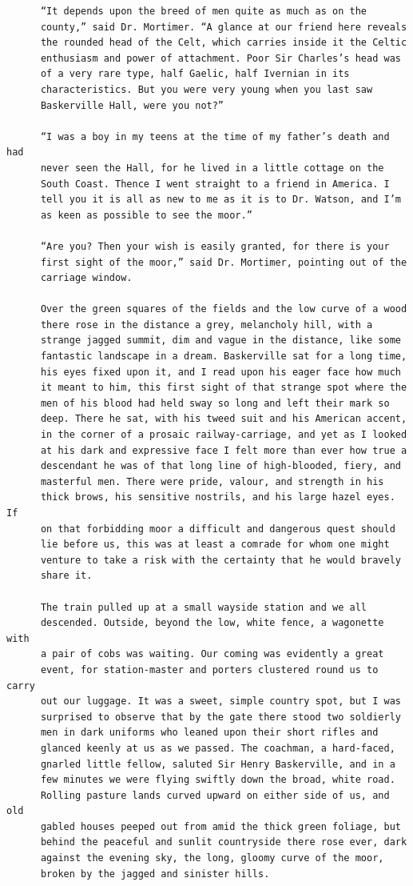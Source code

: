 \documentclass{article}
\begin{document}
\begin{verbatim}
      “It depends upon the breed of men quite as much as on the
      county,” said Dr. Mortimer. “A glance at our friend here reveals
      the rounded head of the Celt, which carries inside it the Celtic
      enthusiasm and power of attachment. Poor Sir Charles’s head was
      of a very rare type, half Gaelic, half Ivernian in its
      characteristics. But you were very young when you last saw
      Baskerville Hall, were you not?”

      “I was a boy in my teens at the time of my father’s death and had
      never seen the Hall, for he lived in a little cottage on the
      South Coast. Thence I went straight to a friend in America. I
      tell you it is all as new to me as it is to Dr. Watson, and I’m
      as keen as possible to see the moor.”

      “Are you? Then your wish is easily granted, for there is your
      first sight of the moor,” said Dr. Mortimer, pointing out of the
      carriage window.

      Over the green squares of the fields and the low curve of a wood
      there rose in the distance a grey, melancholy hill, with a
      strange jagged summit, dim and vague in the distance, like some
      fantastic landscape in a dream. Baskerville sat for a long time,
      his eyes fixed upon it, and I read upon his eager face how much
      it meant to him, this first sight of that strange spot where the
      men of his blood had held sway so long and left their mark so
      deep. There he sat, with his tweed suit and his American accent,
      in the corner of a prosaic railway-carriage, and yet as I looked
      at his dark and expressive face I felt more than ever how true a
      descendant he was of that long line of high-blooded, fiery, and
      masterful men. There were pride, valour, and strength in his
      thick brows, his sensitive nostrils, and his large hazel eyes. If
      on that forbidding moor a difficult and dangerous quest should
      lie before us, this was at least a comrade for whom one might
      venture to take a risk with the certainty that he would bravely
      share it.

      The train pulled up at a small wayside station and we all
      descended. Outside, beyond the low, white fence, a wagonette with
      a pair of cobs was waiting. Our coming was evidently a great
      event, for station-master and porters clustered round us to carry
      out our luggage. It was a sweet, simple country spot, but I was
      surprised to observe that by the gate there stood two soldierly
      men in dark uniforms who leaned upon their short rifles and
      glanced keenly at us as we passed. The coachman, a hard-faced,
      gnarled little fellow, saluted Sir Henry Baskerville, and in a
      few minutes we were flying swiftly down the broad, white road.
      Rolling pasture lands curved upward on either side of us, and old
      gabled houses peeped out from amid the thick green foliage, but
      behind the peaceful and sunlit countryside there rose ever, dark
      against the evening sky, the long, gloomy curve of the moor,
      broken by the jagged and sinister hills.


\end{verbatim}
\end{document}
